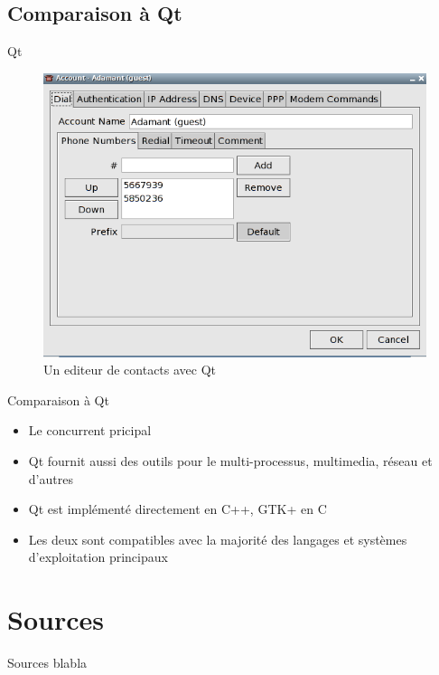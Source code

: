 \documentclass{beamer}
\begin{document}
  \subsection{Comparaison à Qt}
  \begin{frame}{Qt}
    \begin{figure}[htb]
    \centering
    \includegraphics[scale=0.45]{"qt"}
    \caption{Un editeur de contacts avec Qt}
    \label{fig:qt}
    \end{figure}
  \end{frame}
  \begin{frame}{Comparaison à Qt}
  \begin{itemize}
    \item Le concurrent pricipal\\
    \item Qt fournit aussi des outils pour le multi-processus, multimedia, réseau et d'autres\\
    \item Qt est implémenté directement en C++, GTK+ en C\\
    \item Les deux sont compatibles avec la majorité des langages et systèmes d'exploitation principaux
  \end{itemize}
  \end{frame}

  \section{Sources}
  \begin{frame}{Sources}
  blabla
  \end{frame}
\end{document}
